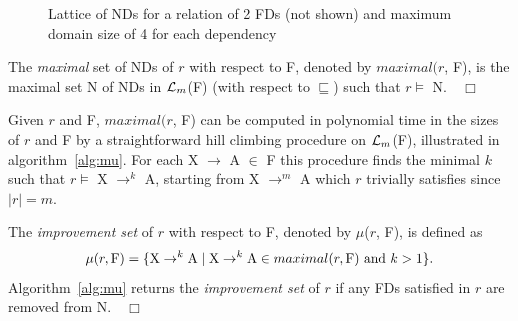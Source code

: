 \begin{figure}[ht]
\centerline{}
\caption{\label{latt:1}Lattice of NDs for a relation of 2 FDs
(not shown) and maximum domain size of 4 for each dependency}
\end{figure}

\begin{definition}
\begin{rm}
The {\em maximal} set of NDs of $r$ with respect to F,
denoted by $maximal(r$, F), is the maximal set N of NDs
in ${\cal L}_m$(F) (with respect to $\sqsubseteq$) such that $r
\models$ N.$\quad\Box$ 
\end{rm}
\end{definition}
\medskip

Given $r$ and F, $maximal(r$, F) can be computed in polynomial time in the
sizes of $r$ and F by a straightforward hill climbing procedure
on ${\cal L}_m$(F), illustrated in algorithm~\ref{alg:mu}. For each X $\to$ A $\in$ F this procedure finds 
the minimal $k$ such that $r \models$ X $\to^k$ A, starting 
from X $\to^m$ A which $r$ trivially satisfies since $\mid r \mid = m$. 

\begin{definition}
\begin{rm}
The {\em improvement set} of $r$ with respect to F, 
denoted by $\mu$($r$, F), is defined as 
\begin{displaymath}
\mu(r, {\rm F}) = \{{\rm X} \to^k {\rm A} \mid 
{\rm X} \to^k {\rm A} \in maximal(r, {\rm F}) \mbox{ and }  k > 1\}.
\end{displaymath}
Algorithm~\ref{alg:mu} returns the {\em improvement set} of $r$ if any FDs
satisfied in $r$ are removed from N.$\quad\Box$
\end{rm}
\end{definition}
\medskip


